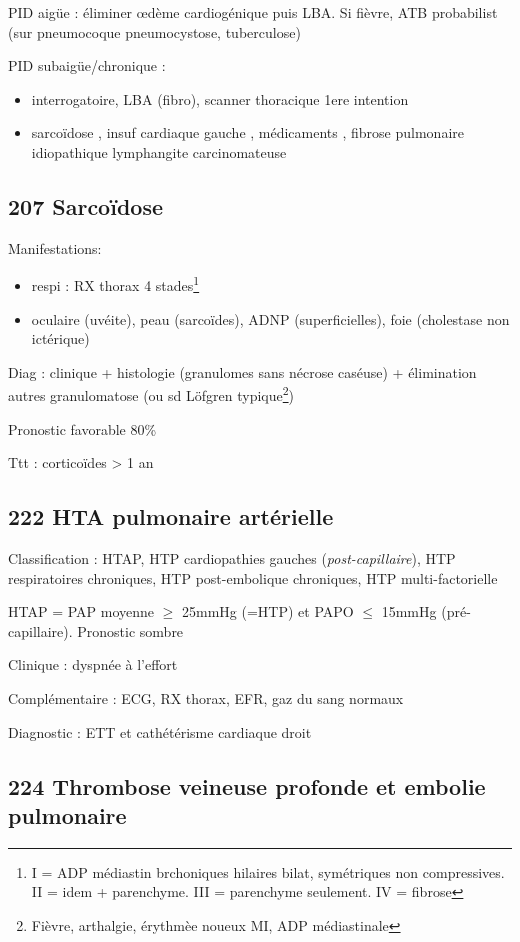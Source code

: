 \documentclass[11pt]{article}
\begin{document}
PID aigüe : éliminer \oe{}dème cardiogénique puis LBA. Si fièvre, ATB
probabilist (sur pneumocoque \textpm{} pneumocystose, tuberculose)

PID subaigüe/chronique : 
\begin{itemize}
\item interrogatoire, LBA (fibro), scanner thoracique 1ere intention
\item sarcoïdose , insuf cardiaque gauche , médicaments , fibrose pulmonaire idiopathique lymphangite carcinomateuse
\end{itemize}
\subsection{207 Sarcoïdose}
\label{sec:org443fb66}
Manifestations: 
\begin{itemize}
\item respi : RX thorax 4 stades\footnote{I = ADP médiastin brchoniques hilaires bilat, symétriques non
compressives. II = idem + parenchyme. III = parenchyme seulement. IV = fibrose}
\item oculaire (uvéite), peau (sarcoïdes), ADNP (superficielles), foie (cholestase non ictérique)
\end{itemize}

Diag : clinique + histologie (granulomes sans nécrose caséuse) + élimination
autres granulomatose (ou sd Löfgren typique\footnote{Fièvre, arthalgie, érythmèe noueux MI, ADP médiastinale})

Pronostic favorable 80\%

Ttt : corticoïdes > 1 an 
\subsection{222 HTA pulmonaire artérielle}
\label{sec:org89b26c7}
Classification : HTAP, HTP cardiopathies gauches (\emph{post-capillaire}), HTP respiratoires chroniques, HTP
post-embolique chroniques, HTP multi-factorielle

HTAP = PAP moyenne \(\ge\) 25mmHg (=HTP) et PAPO \(\le\) 15mmHg
(pré-capillaire). Pronostic sombre

Clinique : dyspnée à l'effort

Complémentaire : ECG, RX thorax, EFR, gaz du sang normaux

Diagnostic : ETT et cathétérisme cardiaque droit

\subsection{224 Thrombose veineuse profonde et embolie pulmonaire}
\label{sec:org84a18b3}
\end{document}
